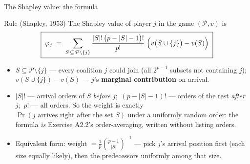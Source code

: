 \documentclass[aspectratio=169,11pt]{beamer}
\begin{document}
\begin{frame}{The Shapley value: the formula}
  \footnotesize
  \begin{block}{Rule (Shapley, 1953)}
    The Shapley value of player $j$ in the game $(\mathcal{P},v)$ is
    \[
      \boxed{\;\varphi_j \;=\; \sum_{S \,\subseteq\, \mathcal{P}\setminus\{j\}}
      \frac{|S|!\,\bigl(p-|S|-1\bigr)!}{p!}\;
      \Bigl(v\bigl(S\cup\{j\}\bigr)-v(S)\Bigr)\;}
    \]
  \end{block}
  \begin{readme}
    \begin{itemize}
      \item $S \subseteq \mathcal{P}\setminus\{j\}$ --- every coalition $j$ could join
            (all $2^{p-1}$ subsets not containing $j$);\quad
            $v(S\cup\{j\})-v(S)$ --- $j$'s \textbf{marginal contribution} on arrival.
      \item $|S|!$ --- arrival orders of $S$ \emph{before} $j$;\ $(p-|S|-1)!$ ---
            orders of the rest \emph{after} $j$;\ $p!$ --- all orders. So the weight is
            exactly $\Pr(\text{$j$ arrives right after the set } S)$ under a uniformly
            random order: the formula \emph{is} Exercise A2.2's order-averaging,
            written without listing orders.
      \item Equivalent form: weight $=\frac{1}{p}\binom{p-1}{|S|}^{-1}$ --- pick $j$'s
            arrival position first (each size equally likely), then the predecessors
            uniformly among that size.
    \end{itemize}
  \end{readme}
\end{frame}
\end{document}
